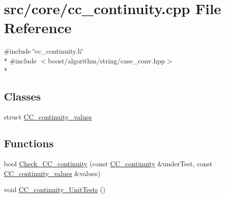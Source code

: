 \hypertarget{a00201}{\section{src/core/cc\-\_\-continuity.cpp File Reference}
\label{a00201}
}
{\ttfamily \#include \char`\"{}cc\-\_\-continuity.\-h\char`\"{}}\\*
{\ttfamily \#include $<$boost/algorithm/string/case\-\_\-conv.\-hpp$>$}\\*
\subsection*{Classes}
\begin{DoxyCompactItemize}
\item 
struct \hyperlink{a00028}{C\-C\-\_\-continuity\-\_\-values}
\end{DoxyCompactItemize}
\subsection*{Functions}
\begin{DoxyCompactItemize}
\item 
bool \hyperlink{a00201_a5855f510cf5e01595ba08d959b1a701d}{Check\-\_\-\-C\-C\-\_\-continuity} (const \hyperlink{a00027}{C\-C\-\_\-continuity} \&under\-Test, const \hyperlink{a00028}{C\-C\-\_\-continuity\-\_\-values} \&values)
\item 
void \hyperlink{a00201_a8daadaacfcc6d54a48f7853fe864bc46}{C\-C\-\_\-continuity\-\_\-\-Unit\-Tests} ()
\end{DoxyCompactItemize}


